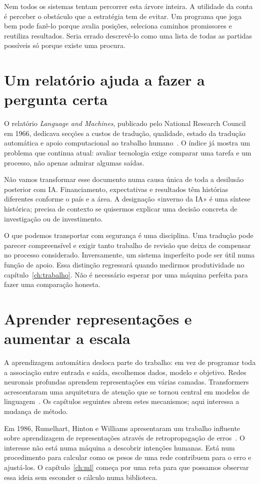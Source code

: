 Nem todos os sistemas tentam percorrer esta árvore inteira. A utilidade da conta é perceber o obstáculo que a estratégia tem de evitar. Um programa que joga bem pode fazê-lo porque avalia posições, seleciona caminhos promissores e reutiliza resultados. Seria errado descrevê-lo como uma lista de todas as partidas possíveis só porque existe uma procura.

\section{Um relatório ajuda a fazer a pergunta certa}
O relatório \emph{Language and Machines}, publicado pelo National Research Council em 1966, dedicava secções a custos de tradução, qualidade, estado da tradução automática e apoio computacional ao trabalho humano~\citep{alpac1966}. O índice já mostra um problema que continua atual: avaliar tecnologia exige comparar uma tarefa e um processo, não apenas admirar algumas saídas.

Não vamos transformar esse documento numa causa única de toda a desilusão posterior com IA. Financiamento, expectativas e resultados têm histórias diferentes conforme o país e a área. A designação «inverno da IA» é uma síntese histórica; precisa de contexto se quisermos explicar uma decisão concreta de investigação ou de investimento.

O que podemos transportar com segurança é uma disciplina. Uma tradução pode parecer compreensível e exigir tanto trabalho de revisão que deixa de compensar no processo considerado. Inversamente, um sistema imperfeito pode ser útil numa função de apoio. Essa distinção regressará quando medirmos produtividade no capítulo~\ref{ch:trabalho}. Não é necessário esperar por uma máquina perfeita para fazer uma comparação honesta.

\section{Aprender representações e aumentar a escala}
A aprendizagem automática desloca parte do trabalho: em vez de programar toda a associação entre entrada e saída, escolhemos dados, modelo e objetivo. Redes neuronais profundas aprendem representações em várias camadas. Transformers acrescentaram uma arquitetura de atenção que se tornou central em modelos de linguagem~\citep{vaswani2017}. Os capítulos seguintes abrem estes mecanismos; aqui interessa a mudança de método.

Em 1986, Rumelhart, Hinton e Williams apresentaram um trabalho influente sobre aprendizagem de representações através de retropropagação de erros~\citep{rumelhart1986}. O interesse não está numa máquina a descobrir intenções humanas. Está num procedimento para calcular como os pesos de uma rede contribuem para o erro e ajustá-los. O capítulo~\ref{ch:ml} começa por uma reta para que possamos observar essa ideia sem esconder o cálculo numa biblioteca.

